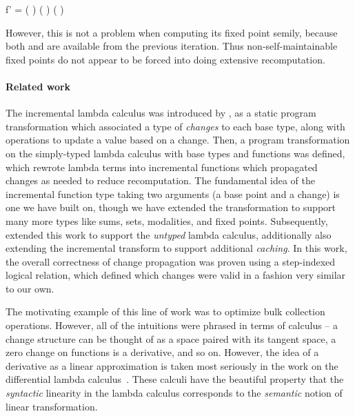 \begin{code}
  f' \< \< =
  ( \relcomp {})
  \vee ( \relcomp {})
  \vee ( \relcomp {})
\end{code}

\noindent
However, this is not a problem when computing its fixed point semi\naive{}ly,
because both  and  are available from the previous
iteration. Thus non-self-maintainable fixed points do not appear to be forced
into doing extensive recomputation.



\paragraph{Related work}

The incremental lambda calculus was introduced by \citet{incremental},
as a static program transformation which associated a type of
\emph{changes} to each base type, along with operations to update a
value based on a change.  Then, a program transformation on the
simply-typed lambda calculus with base types and functions was
defined, which rewrote lambda terms into incremental functions which
propagated changes as needed to reduce recomputation. The fundamental
idea of the incremental function type taking two arguments (a base
point and a change) is one we have built on, though we have extended
the transformation to support many more types like sums, sets,
modalities, and fixed points.
%
Subsequently, \citet{DBLP:conf/esop/GiarrussoRS19} extended this work
to support the \emph{untyped} lambda calculus, additionally also
extending the incremental transform to support additional
\emph{caching}. In this work, the overall correctness of change
propagation was proven using a step-indexed logical relation, which
defined which changes were valid in a fashion very similar to our own.

The motivating example of this line of work was to optimize bulk collection
operations. However, all of the intuitions were phrased in terms of calculus --
a change structure can be thought of as a space paired with its tangent space, a
zero change on functions is a derivative, and so on. However, the idea of a
derivative as a linear approximation is taken most seriously in the work on the
differential lambda calculus~\cite{dlc}. These calculi have the beautiful
property that the \emph{syntactic} linearity in the lambda calculus corresponds
to the \emph{semantic} notion of linear transformation.

